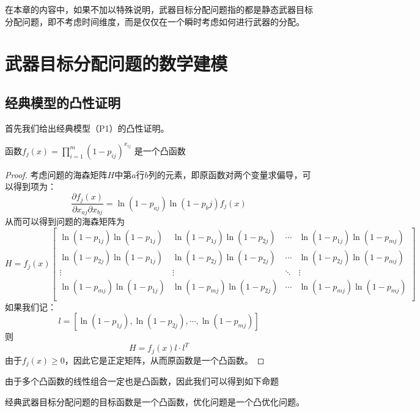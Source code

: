 在本章的内容中，如果不加以特殊说明，武器目标分配问题指的都是静态武器目标分配问题，即不考虑时间维度，而是仅仅在一个瞬时考虑如何进行武器的分配。

\section{武器目标分配问题的数学建模}
\subsection{经典模型的凸性证明}
首先我们给出经典模型（P1）的凸性证明。
\begin{proposition}
    函数$f_j(x) = \prod_{i=1}^m (1 - p_{ij}) ^ {x_{ij}}$ 是一个凸函数
\end{proposition}
\begin{proof}
    考虑问题的海森矩阵$H$中第$a$行$b$列的元素，即原函数对两个变量求偏导，可以得到项为：
    \begin{equation*}
        \frac{\partial f_j(x)}{\partial x_{aj} \partial x_{bj}} = \ln(1 - p_{aj})\ln(1-p_bj)f_j(x)
    \end{equation*}
    从而可以得到问题的海森矩阵为
    \begin{equation*}
        H = f_j(x)\begin{bmatrix}
            \ln(1 - p_{1j})\ln(1-p_{1j}) & \ln(1 - p_{1j})\ln(1-p_{2j}) & \cdots & \ln(1 - p_{1j})\ln(1-p_{mj}) \\
            \ln(1 - p_{2j})\ln(1-p_{1j}) & \ln(1 - p_{2j})\ln(1-p_{2j}) & \cdots & \ln(1 - p_{2j})\ln(1-p_{mj}) \\
            \vdots & \vdots & \ddots & \vdots \\
            \ln(1 - p_{mj})\ln(1-p_{1j}) & \ln(1 - p_{mj})\ln(1-p_{2j}) & \cdots & \ln(1 - p_{mj})\ln(1-p_{mj}) \\
            \end{bmatrix}
    \end{equation*}
    如果我们记：
    \begin{equation}
        l = \left[ \ln(1-p_{1j}), \ln(1-p_{2j}), \cdots, \ln(1-p_{mj}) \right]
        \end{equation}
    则
    \begin{equation*}
        H = f_j(x) l\cdot l^T
    \end{equation*}
    由于$f_j(x) \geq 0$，因此它是正定矩阵，从而原函数是一个凸函数。
\end{proof}
由于多个凸函数的线性组合一定也是凸函数，因此我们可以得到如下命题
\begin{proposition}
    经典武器目标分配问题的目标函数是一个凸函数，优化问题是一个凸优化问题。
\end{proposition}


